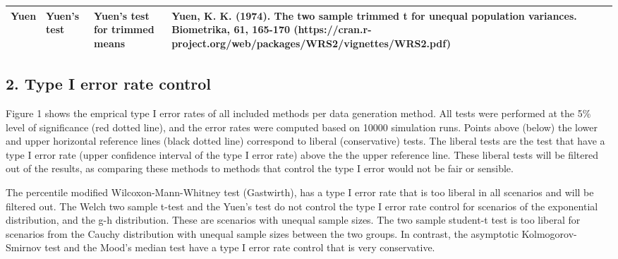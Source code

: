 \documentclass[
]{article}
\newenvironment{Shaded}{\begin{snugshade}}{\end{snugshade}}
\newcommand{\AttributeTok}[1]{\textcolor[rgb]{0.77,0.63,0.00}{#1}}
\newcommand{\FunctionTok}[1]{\textcolor[rgb]{0.00,0.00,0.00}{#1}}
\newcommand{\NormalTok}[1]{#1}
\newcommand{\OtherTok}[1]{\textcolor[rgb]{0.56,0.35,0.01}{#1}}
\newcommand{\SpecialCharTok}[1]{\textcolor[rgb]{0.00,0.00,0.00}{#1}}
\newcommand{\StringTok}[1]{\textcolor[rgb]{0.31,0.60,0.02}{#1}}
\begin{document}
\begin{landscape}
\begin{table}[H]
\begin{tabular}[t]{>{}l>{}l>{}l>{}l>{}NA}
Yuen & Yuen's test & Yuen's test for trimmed means & Yuen, K. K. (1974). The two sample trimmed t for unequal population variances. Biometrika, 61, 165-170 (https://cran.r-project.org/web/packages/WRS2/vignettes/WRS2.pdf)\\
\bottomrule
\end{tabular}
\end{table}
\end{landscape}

\hypertarget{type-i-error-rate-control}{%
\subsection{2. Type I error rate
control}\label{type-i-error-rate-control}}

Figure 1 shows the emprical type I error rates of all included methods
per data generation method. All tests were performed at the 5\% level of
significance (red dotted line), and the error rates were computed based
on 10000 simulation runs. Points above (below) the lower and upper
horizontal reference lines (black dotted line) correspond to liberal
(conservative) tests. The liberal tests are the test that have a type I
error rate (upper confidence interval of the type I error rate) above
the the upper reference line. These liberal tests will be filtered out
of the results, as comparing these methods to methods that control the
type I error would not be fair or sensible.

The percentile modified Wilcoxon-Mann-Whitney test (Gastwirth), has a
type I error rate that is too liberal in all scenarios and will be
filtered out. The Welch two sample t-test and the Yuen's test do not
control the type I error rate control for scenarios of the exponential
distribution, and the g-h distribution. These are scenarios with unequal
sample sizes. The two sample student-t test is too liberal for scenarios
from the Cauchy distribution with unequal sample sizes between the two
groups. In contrast, the asymptotic Kolmogorov-Smirnov test and the
Mood's median test have a type I error rate control that is very
conservative.

\begin{Shaded}
\end{Shaded}
\end{document}
